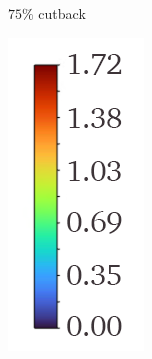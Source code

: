\documentclass[a4paper, 11pt, oneside]{report}
\begin{document}
\begin{figure}[H]
\begin{subfigure}{.42\textwidth}
		\caption{$75\%$ cutback}
		\vspace{0.018\textheight}
	\end{subfigure}
	\begin{subfigure}{.15\textwidth}
		\centering
		\includegraphics[width=\linewidth]{figs/mach_legend_choked.png}

\end{subfigure}
\end{figure}
\end{document}
